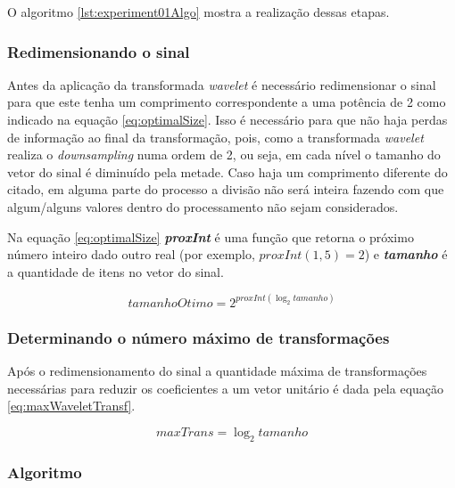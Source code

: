 \begin{myenv}{1.5}
					\par O algoritmo \ref{lst:experiment01Algo} mostra a realização dessas etapas.
				
				\subsubsection{Redimensionando o sinal}
					\par Antes da aplicação da transformada \textit{wavelet} é necessário redimensionar o sinal para que este tenha um comprimento correspondente a uma potência de 2 como indicado na equação \ref{eq:optimalSize}. Isso é necessário para que não haja perdas de informação ao final da transformação, pois, como a transformada \textit{wavelet} realiza o \textit{downsampling} numa ordem de 2, ou seja, em cada nível o tamanho do vetor do sinal é diminuído pela metade. Caso haja um comprimento diferente do citado, em alguma parte do processo a divisão não será inteira fazendo com que algum/alguns valores dentro do processamento não sejam considerados.
					
					\par Na equação \ref{eq:optimalSize} \textit{\textbf{proxInt}} é uma função que retorna o próximo número inteiro dado outro real (por exemplo, $proxInt(1,5) = 2$) e \textit{\textbf{tamanho}} é a quantidade de itens no vetor do sinal.

					\begin{equation}
						tamanhoOtimo=2^{proxInt(\log_{2}tamanho)}
						\label{eq:optimalSize}
					\end{equation} 
				
				\subsubsection{Determinando o número máximo de transformações}
					\par Após o redimensionamento do sinal a quantidade máxima de transformações necessárias para reduzir os coeficientes a um vetor unitário é dada pela equação \ref{eq:maxWaveletTransf}. 
					
					\begin{equation}
						maxTrans=\log_{2}tamanho
						\label{eq:maxWaveletTransf}
					\end{equation}
	

				\subsubsection{Algoritmo}
				


\end{myenv}
